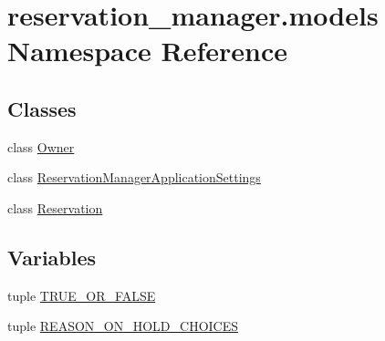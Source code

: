 \hypertarget{namespacereservation__manager_1_1models}{\section{reservation\-\_\-manager.\-models Namespace Reference}
\label{namespacereservation__manager_1_1models}
}
\subsection*{Classes}
\begin{DoxyCompactItemize}
\item 
class \hyperlink{classreservation__manager_1_1models_1_1Owner}{Owner}
\item 
class \hyperlink{classreservation__manager_1_1models_1_1ReservationManagerApplicationSettings}{Reservation\-Manager\-Application\-Settings}
\item 
class \hyperlink{classreservation__manager_1_1models_1_1Reservation}{Reservation}
\end{DoxyCompactItemize}
\subsection*{Variables}
\begin{DoxyCompactItemize}
\item 
tuple \hyperlink{namespacereservation__manager_1_1models_af585bf5affae3c2f4d6f7ee54371a0ec}{T\-R\-U\-E\-\_\-\-O\-R\-\_\-\-F\-A\-L\-S\-E}
\item 
tuple \hyperlink{namespacereservation__manager_1_1models_a435b3782f874d82dd97276b49043592c}{R\-E\-A\-S\-O\-N\-\_\-\-O\-N\-\_\-\-H\-O\-L\-D\-\_\-\-C\-H\-O\-I\-C\-E\-S}
\end{DoxyCompactItemize}


